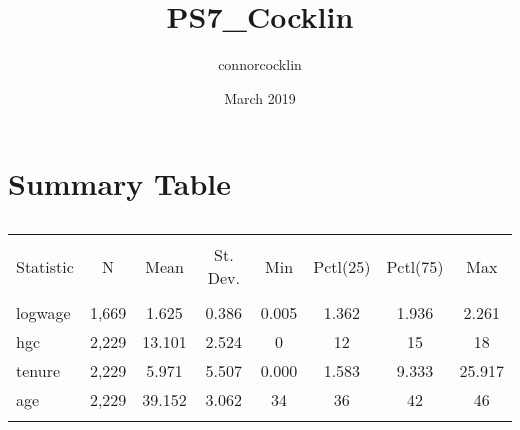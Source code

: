 \documentclass{article}
\title{PS7_Cocklin}
\author{connorcocklin }
\date{March 2019}
\begin{document}
\maketitle

\section{Summary Table}
\begin{table}[!htbp] \centering 
  \caption{} 
  \label{} 
\begin{tabular}{@{\extracolsep{5pt}}lccccccc} 
\\[-1.8ex]\hline 
\hline \\[-1.8ex] 
Statistic & \multicolumn{1}{c}{N} & \multicolumn{1}{c}{Mean} & \multicolumn{1}{c}{St. Dev.} & \multicolumn{1}{c}{Min} & \multicolumn{1}{c}{Pctl(25)} & \multicolumn{1}{c}{Pctl(75)} & \multicolumn{1}{c}{Max} \\ 
\hline \\[-1.8ex] 
logwage & 1,669 & 1.625 & 0.386 & 0.005 & 1.362 & 1.936 & 2.261 \\ 
hgc & 2,229 & 13.101 & 2.524 & 0 & 12 & 15 & 18 \\ 
tenure & 2,229 & 5.971 & 5.507 & 0.000 & 1.583 & 9.333 & 25.917 \\ 
age & 2,229 & 39.152 & 3.062 & 34 & 36 & 42 & 46 \\ 
\hline \\[-1.8ex] 
\end{tabular} 
\end{table} 
\end{document}
